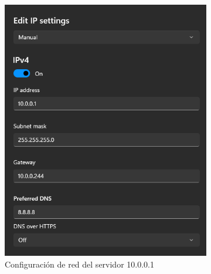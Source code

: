 \documentclass[%
    school=etsisi,%
    degree=61TI,%
]{upm-report}
\begin{document}
\begin{figure}
    \centering
    \begin{subfigure}{0.49\textwidth}
        \includegraphics[width=\linewidth]{figures/ip-config-01.png}
        \caption{\label{fig:ip-config-01} Configuración de red del servidor 10.0.0.1}
    \end{subfigure}
    \begin{subfigure}{0.49\textwidth}

\end{subfigure}
\end{figure}
\end{document}
